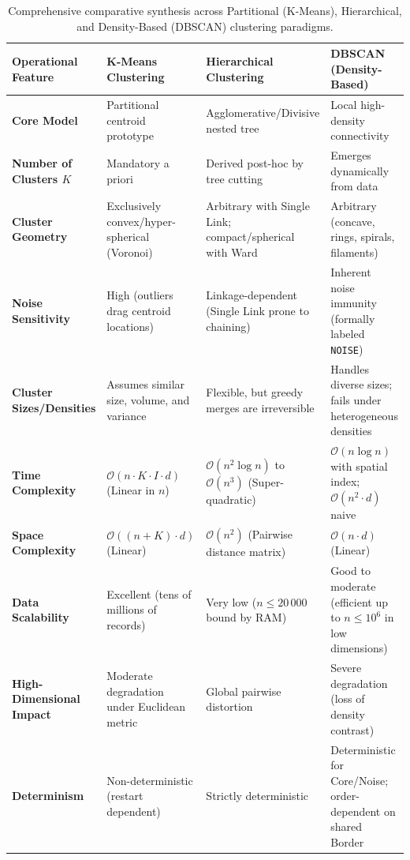 \begin{table}[htbp]
\centering
\scriptsize
\renewcommand{\arraystretch}{1.35}
\begin{tabularx}{\textwidth}{l Y Y Y}
\toprule
\textbf{Operational Feature} & \textbf{K-Means Clustering} & \textbf{Hierarchical Clustering} & \textbf{DBSCAN (Density-Based)} \\
\midrule
\textbf{Core Model} & Partitional centroid prototype & Agglomerative/Divisive nested tree & Local high-density connectivity \\
\textbf{Number of Clusters $K$} & Mandatory a priori & Derived post-hoc by tree cutting & Emerges dynamically from data \\
\textbf{Cluster Geometry} & Exclusively convex/hyper-spherical (Voronoi) & Arbitrary with Single Link; compact/spherical with Ward & Arbitrary (concave, rings, spirals, filaments) \\
\textbf{Noise Sensitivity} & High (outliers drag centroid locations) & Linkage-dependent (Single Link prone to chaining) & Inherent noise immunity (formally labeled \texttt{NOISE}) \\
\textbf{Cluster Sizes/Densities} & Assumes similar size, volume, and variance & Flexible, but greedy merges are irreversible & Handles diverse sizes; fails under heterogeneous densities \\
\textbf{Time Complexity} & $\mathcal{O}(n \cdot K \cdot I \cdot d)$ (Linear in $n$) & $\mathcal{O}(n^2 \log n)$ to $\mathcal{O}(n^3)$ (Super-quadratic) & $\mathcal{O}(n \log n)$ with spatial index; $\mathcal{O}(n^2 \cdot d)$ naive \\
\textbf{Space Complexity} & $\mathcal{O}((n + K) \cdot d)$ (Linear) & $\mathcal{O}(n^2)$ (Pairwise distance matrix) & $\mathcal{O}(n \cdot d)$ (Linear) \\
\textbf{Data Scalability} & Excellent (tens of millions of records) & Very low ($n \le 20\,000$ bound by RAM) & Good to moderate (efficient up to $n \le 10^6$ in low dimensions) \\
\textbf{High-Dimensional Impact} & Moderate degradation under Euclidean metric & Global pairwise distortion & Severe degradation (loss of density contrast) \\
\textbf{Determinism} & Non-deterministic (restart dependent) & Strictly deterministic & Deterministic for Core/Noise; order-dependent on shared Border \\
\bottomrule
\end{tabularx}
\caption{Comprehensive comparative synthesis across Partitional (K-Means), Hierarchical, and Density-Based (DBSCAN) clustering paradigms.}
\label{tab:dm-clustering-all-comparison}
\end{table}
